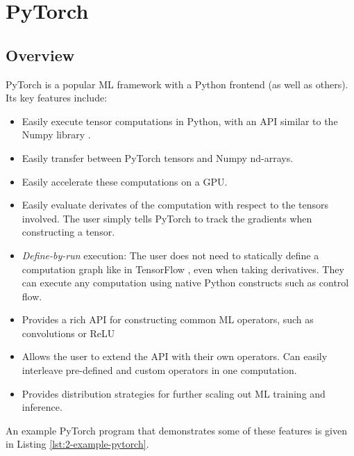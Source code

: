 \section{PyTorch}
\subsection{Overview}
PyTorch \cite{Paszke2017} is a popular ML framework with a Python frontend (as well as others).
Its key features include:
\begin{itemize}[topsep=0.2em, parsep=0.5\parskip]
    \item Easily execute tensor computations in Python, with an API similar to the Numpy library \cite{VanDerWalt2011}.
    \item Easily transfer between PyTorch tensors and Numpy nd-arrays.
    \item Easily accelerate these computations on a GPU.
    \item Easily evaluate derivates of the computation with respect to the tensors involved.
    The user simply tells PyTorch to track the gradients when constructing a tensor.
    \item \textit{Define-by-run} execution: The user does not need to statically define a computation graph like in TensorFlow \cite{tensorflow2015-whitepaper}, even when taking derivatives.
    They can execute any computation using native Python constructs such as control flow.
    \item Provides a rich API for constructing common ML operators, such as convolutions or ReLU
    \item Allows the user to extend the API with their own operators.
    Can easily interleave pre-defined and custom operators in one computation.
    \item Provides distribution strategies for further scaling out ML training and inference.
\end{itemize}

An example PyTorch program that demonstrates some of these features is given in Listing \ref{lst:2-example-pytorch}.


\vfill


